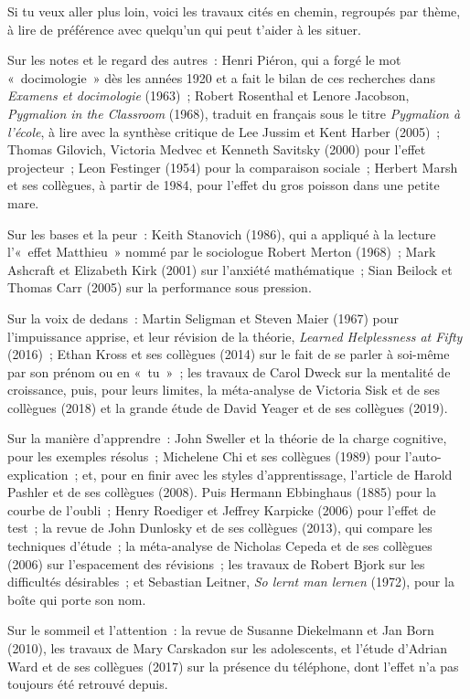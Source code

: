 \documentclass[10.5pt,twoside,openright]{book}
\begin{document}
Si tu veux aller plus loin, voici les travaux cités en chemin, regroupés par thème, à lire de préférence avec quelqu’un qui peut t’aider à les situer.

Sur les notes et le regard des autres : Henri Piéron, qui a forgé le mot « docimologie » dès les années 1920 et a fait le bilan de ces recherches dans \emph{Examens et docimologie} (1963) ; Robert Rosenthal et Lenore Jacobson, \emph{Pygmalion in the Classroom} (1968), traduit en français sous le titre \emph{Pygmalion à l’école}, à lire avec la synthèse critique de Lee Jussim et Kent Harber (2005) ; Thomas Gilovich, Victoria Medvec et Kenneth Savitsky (2000) pour l’effet projecteur ; Leon Festinger (1954) pour la comparaison sociale ; Herbert Marsh et ses collègues, à partir de 1984, pour l’effet du gros poisson dans une petite mare.

Sur les bases et la peur : Keith Stanovich (1986), qui a appliqué à la lecture l’« effet Matthieu » nommé par le sociologue Robert Merton (1968) ; Mark Ashcraft et Elizabeth Kirk (2001) sur l’anxiété mathématique ; Sian Beilock et Thomas Carr (2005) sur la performance sous pression.

Sur la voix de dedans : Martin Seligman et Steven Maier (1967) pour l’impuissance apprise, et leur révision de la théorie, \emph{Learned Helplessness at Fifty} (2016) ; Ethan Kross et ses collègues (2014) sur le fait de se parler à soi-même par son prénom ou en « tu » ; les travaux de Carol Dweck sur la mentalité de croissance, puis, pour leurs limites, la méta-analyse de Victoria Sisk et de ses collègues (2018) et la grande étude de David Yeager et de ses collègues (2019).

Sur la manière d’apprendre : John Sweller et la théorie de la charge cognitive, pour les exemples résolus ; Michelene Chi et ses collègues (1989) pour l’auto-explication ; et, pour en finir avec les styles d’apprentissage, l’article de Harold Pashler et de ses collègues (2008). Puis Hermann Ebbinghaus (1885) pour la courbe de l’oubli ; Henry Roediger et Jeffrey Karpicke (2006) pour l’effet de test ; la revue de John Dunlosky et de ses collègues (2013), qui compare les techniques d’étude ; la méta-analyse de Nicholas Cepeda et de ses collègues (2006) sur l’espacement des révisions ; les travaux de Robert Bjork sur les difficultés désirables ; et Sebastian Leitner, \emph{So lernt man lernen} (1972), pour la boîte qui porte son nom.

Sur le sommeil et l’attention : la revue de Susanne Diekelmann et Jan Born (2010), les travaux de Mary Carskadon sur les adolescents, et l’étude d’Adrian Ward et de ses collègues (2017) sur la présence du téléphone, dont l’effet n’a pas toujours été retrouvé depuis.
\end{document}
